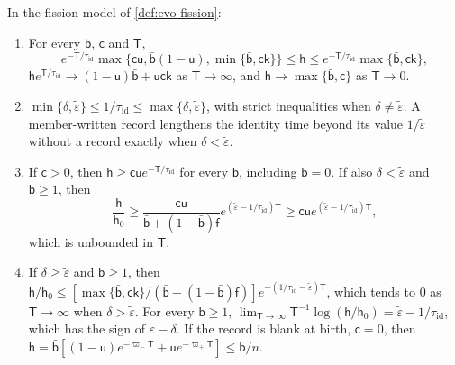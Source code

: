 \begin{theorem}\label{thm:evo-record-channel}
In the fission model of \cref{def:evo-fission}:
\begin{enumerate}
\item[(a)] For every $\mathsf b$, $\mathsf c$ and $\mathsf T$,
\begin{equation}\label{eq:evo-sandwich}
e^{-\mathsf T/\tau_{\mathrm{id}}}\max\{\mathsf c\mathsf u,\bar{\mathsf b}(1-\mathsf u),\min\{\bar{\mathsf b},\mathsf c\mathsf k\}\}\le\mathsf h\le e^{-\mathsf T/\tau_{\mathrm{id}}}\max\{\bar{\mathsf b},\mathsf c\mathsf k\},
\end{equation}
$\mathsf he^{\mathsf T/\tau_{\mathrm{id}}}\to(1-\mathsf u)\bar{\mathsf b}+\mathsf u\mathsf c\mathsf k$ as $\mathsf T\to\infty$, and $\mathsf h\to\max\{\bar{\mathsf b},\mathsf c\}$ as $\mathsf T\to0$.
\item[(b)] $\min\{\delta,\tilde\varepsilon\}\le1/\tau_{\mathrm{id}}\le\max\{\delta,\tilde\varepsilon\}$, with strict inequalities when $\delta\ne\tilde\varepsilon$. A member-written record lengthens the identity time beyond its value $1/\tilde\varepsilon$ without a record exactly when $\delta<\tilde\varepsilon$.
\item[(c)] If $\mathsf c>0$, then $\mathsf h\ge\mathsf c\mathsf ue^{-\mathsf T/\tau_{\mathrm{id}}}$ for every $\mathsf b$, including $\mathsf b=0$. If also $\delta<\tilde\varepsilon$ and $\mathsf b\ge1$, then
\begin{equation*}
\frac{\mathsf h}{\mathsf h_0}\ge\frac{\mathsf c\mathsf u}{\bar{\mathsf b}+(1-\bar{\mathsf b})\mathsf f}e^{(\tilde\varepsilon-1/\tau_{\mathrm{id}})\mathsf T}\ge\mathsf c\mathsf ue^{(\tilde\varepsilon-1/\tau_{\mathrm{id}})\mathsf T},
\end{equation*}
which is unbounded in $\mathsf T$.
\item[(d)] If $\delta\ge\tilde\varepsilon$ and $\mathsf b\ge1$, then $\mathsf h/\mathsf h_0\le[\max\{\bar{\mathsf b},\mathsf c\mathsf k\}/(\bar{\mathsf b}+(1-\bar{\mathsf b})\mathsf f)]e^{-(1/\tau_{\mathrm{id}}-\tilde\varepsilon)\mathsf T}$, which tends to $0$ as $\mathsf T\to\infty$ when $\delta>\tilde\varepsilon$. For every $\mathsf b\ge1$, $\lim_{\mathsf T\to\infty}\mathsf T^{-1}\log(\mathsf h/\mathsf h_0)=\tilde\varepsilon-1/\tau_{\mathrm{id}}$, which has the sign of $\tilde\varepsilon-\delta$. If the record is blank at birth, $\mathsf c=0$, then $\mathsf h=\bar{\mathsf b}[(1-\mathsf u)e^{-\varpi_-\mathsf T}+\mathsf ue^{-\varpi_+\mathsf T}]\le\mathsf b/n$.

\end{enumerate}
\end{theorem}
